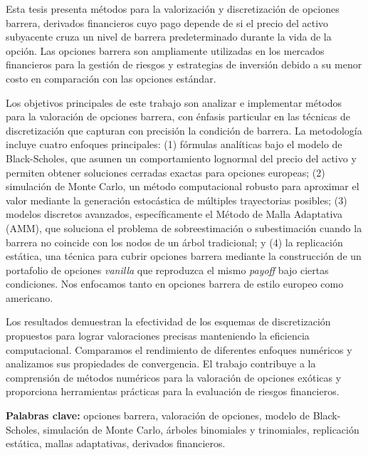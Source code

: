 Esta tesis presenta métodos para la valorización y discretización de opciones barrera, derivados financieros cuyo pago depende de si el precio del activo subyacente cruza un nivel de barrera predeterminado durante la vida de la opción. Las opciones barrera son ampliamente utilizadas en los mercados financieros para la gestión de riesgos y estrategias de inversión debido a su menor costo en comparación con las opciones estándar.

Los objetivos principales de este trabajo son analizar e implementar métodos para la valoración de opciones barrera, con énfasis particular en las técnicas de discretización que capturan con precisión la condición de barrera. La metodología incluye cuatro enfoques principales: (1) fórmulas analíticas bajo el modelo de Black-Scholes, que asumen un comportamiento lognormal del precio del activo y permiten obtener soluciones cerradas exactas para opciones europeas; (2) simulación de Monte Carlo, un método computacional robusto para aproximar el valor mediante la generación estocástica de múltiples trayectorias posibles; (3) modelos discretos avanzados, específicamente el Método de Malla Adaptativa (AMM), que soluciona el problema de sobreestimación o subestimación cuando la barrera no coincide con los nodos de un árbol tradicional; y (4) la replicación estática, una técnica para cubrir opciones barrera mediante la construcción de un portafolio de opciones \textit{vanilla} que reproduzca el mismo \textit{payoff} bajo ciertas condiciones. Nos enfocamos tanto en opciones barrera de estilo europeo como americano.

Los resultados demuestran la efectividad de los esquemas de discretización propuestos para lograr valoraciones precisas manteniendo la eficiencia computacional. Comparamos el rendimiento de diferentes enfoques numéricos y analizamos sus propiedades de convergencia. El trabajo contribuye a la comprensión de métodos numéricos para la valoración de opciones exóticas y proporciona herramientas prácticas para la evaluación de riesgos financieros.

\textbf{Palabras clave:} opciones barrera, valoración de opciones, modelo de Black-Scholes, simulación de Monte Carlo, árboles binomiales y trinomiales, replicación estática, mallas adaptativas, derivados financieros.

